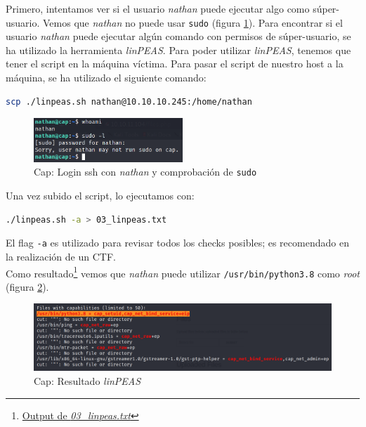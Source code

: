 Primero, intentamos ver si el usuario \textit{nathan} puede ejecutar algo como súper-usuario. Vemos que \textit{nathan} no puede usar \texttt{sudo} (figura \ref{fig:cap-nathan-sudo}). Para encontrar si el usuario \textit{nathan} puede ejecutar algún comando con permisos de súper-usuario, se ha utilizado la herramienta \textit{linPEAS}\cite{peas}. Para poder utilizar \textit{linPEAS}, tenemos que tener el script en la máquina víctima. Para pasar el script de nuestro host a la máquina, se ha utilizado el siguiente comando:
\begin{lstlisting}[language=bash]
scp ./linpeas.sh nathan@10.10.10.245:/home/nathan
\end{lstlisting}

\begin{figure}[h]
    \centering
    \includegraphics[width=0.5\textwidth]{images/machines/cap/nathan-sudo.png}
    \caption{Cap: Login \acrshort{ssh} con \textit{nathan} y comprobación de \texttt{sudo}}
    \label{fig:cap-nathan-sudo}
\end{figure}

Una vez subido el script, lo ejecutamos con:
\begin{lstlisting}[language=bash]
./linpeas.sh -a > 03_linpeas.txt
\end{lstlisting}

El flag \texttt{-a} es utilizado para revisar todos los checks posibles; es recomendado en la realización de un \acrshort{CTF}.\\

Como resultado\footnote{\href{https://github.com/VictorNS69/TFM/blob/main/machines/cap/03_linpeas.txt}{Output de \textit{03\_linpeas.txt}}} vemos que \textit{nathan} puede utilizar \texttt{/usr/bin/python3.8} como \textit{root} (figura \ref{fig:cap-linpeas}).\\

\begin{figure}[h]
    \centering
    \includegraphics[width=1.0\textwidth]{images/machines/cap/linpeas.png}
    \caption{Cap: Resultado \textit{linPEAS}}
    \label{fig:cap-linpeas}
\end{figure}

